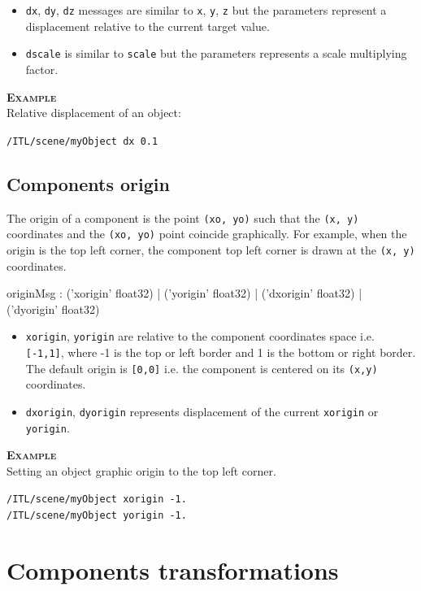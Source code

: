 \documentclass[a4paper,twoside]{report}
\newcommand{\sublevel}[1]	{\section{#1}}
\newcommand{\subsublevel}[1]	{\subsection{#1}}
\newcommand{\OSC}[1]		{\texttt{#1}}
\newcommand{\values}[1]	{\texttt{#1}}
\newcommand{\example}		{\textbf{\hspace{-1.5cm}\textbf{\textsc{Example }}}}
\newcommand{\sample}	[1]			{\vspace{-2mm}\begin{center}\colorbox{mygrey}{
								\begin{minipage}[t]{0.9\columnwidth} 
								{\small \texttt{#1}}
								\end{minipage}}\end{center}}
\begin{document}
\begin{itemize}
\item \OSC{dx}, \OSC{dy}, \OSC{dz} messages are similar to \OSC{x}, \OSC{y}, \OSC{z} but the parameters represent a displacement relative to the current target value.
\item \OSC{dscale} is similar to \OSC{scale} but the parameters represents a scale multiplying factor.
\end{itemize}

\example \\
Relative displacement of an object:
\sample{/ITL/scene/myObject dx 0.1}

\subsublevel{Components origin}
\label{origin}

The origin of a component is the point \values{(xo, yo)} such that the \values{(x, y)} coordinates and the \values{(xo, yo)} point coincide graphically. For example, when the origin is the top left corner, the component top left corner is drawn  at the \values{(x, y)} coordinates.

\begin{rail}
originMsg :  
			('xorigin' float32)
		| 	('yorigin' float32)
		| 	('dxorigin' float32)
		| 	('dyorigin' float32)
\end{rail}

\begin{itemize}
\item \OSC{xorigin}, \OSC{yorigin} are relative to the component coordinates space i.e. \values{[-1,1]}, where -1 is the top or left border and 1 is the bottom or right border. The default origin is \values{[0,0]} i.e. the component is centered on its \values{(x,y)} coordinates.
\item \OSC{dxorigin}, \OSC{dyorigin} represents displacement of the current \OSC{xorigin} or \OSC{yorigin}.
\end{itemize}

\example \\
Setting an object graphic origin to the top left corner.
\sample{/ITL/scene/myObject xorigin -1.\\
/ITL/scene/myObject yorigin -1.
}

\sublevel{Components transformations}
\label{transform}
\end{document}
